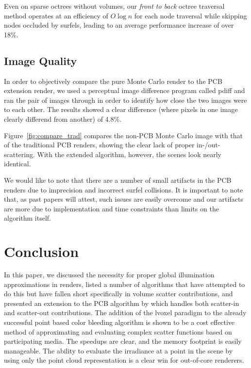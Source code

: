 \documentclass[12pt]{ucthesis}
\begin{document}
Even on sparse octrees without volumes, our \textit{front to back} octree traversal method operates at an efficiency of $O\log{n}$ for each node traversal while skipping nodes occluded by surfels, leading to an average performance increase of over 18\%.

\subsection*{Image Quality}
In order to objectively compare the pure Monte Carlo render to the PCB extension render, we used a perceptual image difference program called pdiff and ran the pair of images through in order to identify how close the two images were to each other.  The results showed a clear difference (where pixels in one image clearly differend from another) of 4.8\%.

Figure~\ref{fig:compare_trad} compares the non-PCB Monte Carlo image with that of the traditional PCB renders, showing the clear lack of proper in-/out-scattering.  With the extended algorithm, however, the scenes look nearly identical.

We would like to note that there are a number of small artifacts in the PCB renders due to imprecision and incorrect surfel collisions.  It is important to note that, as past papers will attest, such issues are easily overcome and our artifacts are more due to implementation and time constraints than limits on the algorithm itself.

\section{Conclusion}

In this paper, we discussed the necessity for proper global illumination approximations in renders, listed a number of algorithms that have attempted to do this but have fallen short specifically in volume scatter contributions, and presented an extension to the PCB algorithm by \cite{christensen:2008} which handles both scatter-in and scatter-out contributions.  The addition of the lvoxel paradigm to the already successful point based color bleeding algorithm is shown to be a cost effective method of approximating and evaluating complex scatter functions based on participating media.  The speedups are clear, and the memory footprint is easily manageable.  The ability to evaluate the irradiance at a point in the scene by using only the point cloud representation is a clear win for out-of-core renderers.
\end{document}

